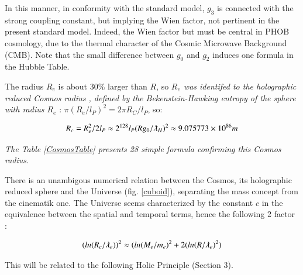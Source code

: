 \documentclass[a4paper,9pt]{article}
\newcounter{row}
\begin{document}
In this manner, in conformity with the standard model, $g_3$ is connected with the strong coupling constant, but implying the Wien factor, not pertinent in the present standard model. Indeed, the Wien factor but must be central in PHOB cosmology, due to the thermal character of the Cosmic Microwave Background (CMB). Note that the small difference between $g_0$ and $g_2$ induces one formula in the Hubble Table. 



The radius $R_e$ is about 30\% larger than $R$, so \textit {$R_e$ was identifed to the holographic reduced Cosmos radius \cite{Sanchez3}, defined by the Bekenstein-Hawking entropy of the sphere with radius $R_e$} \cite{Bekenstein}: $\pi (R_e/l_P)^2 = 2\pi R_C/l_P$, so:   

 \begin{equation}\label{Eq6}
R_c = R_e^2/2l_P \approx 2^{128} l_P (Rg_0/ \lambdabar_H)^2 \approx 9.075773 \times 10^{86} m 
 \end{equation}
 
 \textit{The Table \ref{CosmosTable} presents 28 simple formula confirming this Cosmos radius.}
 
There is an unambigous numerical relation between the Cosmos, its holographic reduced sphere and the Universe \cite{Sanchez3} (fig. \ref{cuboid}), separating the mass concept from the cinematik one. The Universe seems characterized by the constant $c$ in the equivalence between the spatial and temporal terms, hence the following 2 factor :

\begin{equation}\label{Eq7}
(ln(R_c/\lambdabar_e))^2 \approx (ln(M_e/m_e)^2 + 2(ln(R/\lambdabar_e)^2)
\end{equation}

This will be related to the following Holic Principle (Section 3). 
\end{document}
